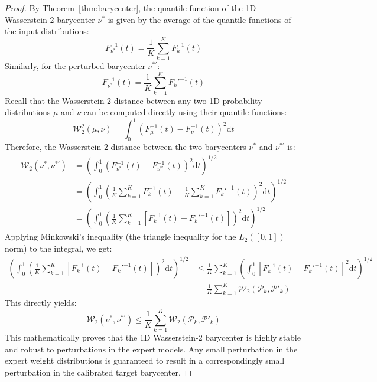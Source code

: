 \documentclass{article}
\theoremstyle{plain}
\theoremstyle{definition}
\theoremstyle{remark}
\begin{document}
\begin{proof}
  By Theorem~\ref{thm:barycenter}, the quantile function of the 1D Wasserstein-2 barycenter $\nu^*$ is given by the average of the quantile functions of the input distributions:
  \begin{equation}
    F_{\nu^*}^{-1}(t) = \frac{1}{K} \sum_{k=1}^K F_k^{-1}(t)
  \end{equation}
  Similarly, for the perturbed barycenter $\nu^{*'}$:
  \begin{equation}
    F_{\nu^{*'}}^{-1}(t) = \frac{1}{K} \sum_{k=1}^K F_k'^{-1}(t)
  \end{equation}
  Recall that the Wasserstein-2 distance between any two 1D probability distributions $\mu$ and $\nu$ can be computed directly using their quantile functions:
  \begin{equation}
    \mathcal{W}_2^2(\mu, \nu) = \int_0^1 \left( F_{\mu}^{-1}(t) - F_{\nu}^{-1}(t) \right)^2 \mathrm{d}t
  \end{equation}
  Therefore, the Wasserstein-2 distance between the two barycenters $\nu^*$ and $\nu^{*'}$ is:
  \begin{align}
    \mathcal{W}_2(\nu^*, \nu^{*'}) &= \left( \int_0^1 \left( F_{\nu^*}^{-1}(t) - F_{\nu^{*'}}^{-1}(t) \right)^2 \mathrm{d}t \right)^{1/2} \nonumber \\
    &= \left( \int_0^1 \left( \frac{1}{K} \sum_{k=1}^K F_k^{-1}(t) - \frac{1}{K} \sum_{k=1}^K F_k'^{-1}(t) \right)^2 \mathrm{d}t \right)^{1/2} \nonumber \\
    &= \left( \int_0^1 \left( \frac{1}{K} \sum_{k=1}^K \left[ F_k^{-1}(t) - F_k'^{-1}(t) \right] \right)^2 \mathrm{d}t \right)^{1/2}
  \end{align}
  Applying Minkowski's inequality (the triangle inequality for the $L_2([0, 1])$ norm) to the integral, we get:
  \begin{align}
    \left( \int_0^1 \left( \frac{1}{K} \sum_{k=1}^K \left[ F_k^{-1}(t) - F_k'^{-1}(t) \right] \right)^2 \mathrm{d}t \right)^{1/2} &\leq \frac{1}{K} \sum_{k=1}^K \left( \int_0^1 \left[ F_k^{-1}(t) - F_k'^{-1}(t) \right]^2 \mathrm{d}t \right)^{1/2} \nonumber \\
    &= \frac{1}{K} \sum_{k=1}^K \mathcal{W}_2(\mathcal{P}_k, \mathcal{P}'_k)
  \end{align}
  This directly yields:
  \begin{equation}
    \mathcal{W}_2(\nu^*, \nu^{*'}) \leq \frac{1}{K} \sum_{k=1}^K \mathcal{W}_2(\mathcal{P}_k, \mathcal{P}'_k)
  \end{equation}
  This mathematically proves that the 1D Wasserstein-2 barycenter is highly stable and robust to perturbations in the expert models. Any small perturbation in the expert weight distributions is guaranteed to result in a correspondingly small perturbation in the calibrated target barycenter.
\end{proof}
\end{document}
